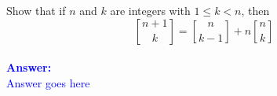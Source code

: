 \item{}
Show that if $n$ and $k$ are integers with $1\le k<n$, then
$${n+1\brack k}={n\brack k-1}+n{n\brack k}$$
\ \\[12pt]
\ifanswers
\textcolor{blue}{
\textbf{Answer:}\\[6pt]
Answer goes here
}
\newpage
\fi
